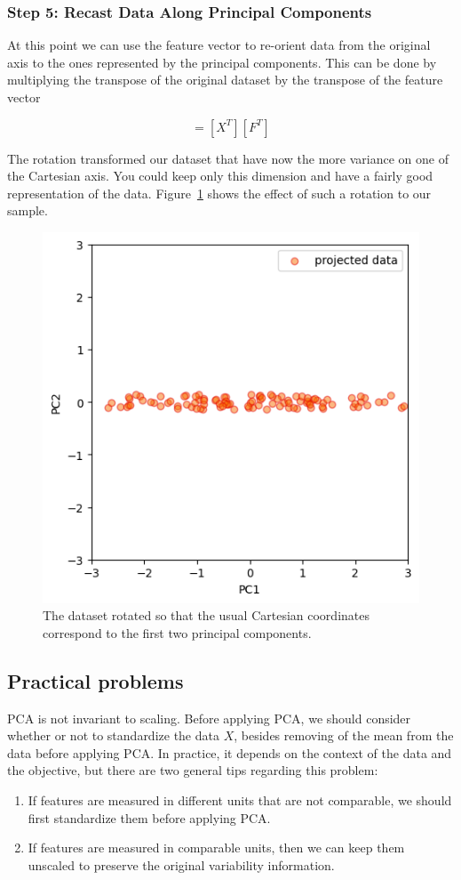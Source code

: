 \subsubsection*{Step 5: Recast Data Along Principal Components}

At this point we can use the feature vector to re-orient data from the original axis to the ones represented by the principal components. 
This can be done by multiplying the transpose of the original dataset by the transpose of the feature vector

\begin{equation}
[Y] = [X^T][F^T]
\end{equation}

The rotation transformed our dataset that have now the more variance on one of the Cartesian axis. 
You could keep only this dimension and have a fairly good representation of the data. Figure~\ref{fig:pca_rotated} shows the effect of such a rotation to our sample.
\begin{figure}[hbtp]
\centering
\includegraphics[width=0.5\linewidth]{figures/pca_projected}
\caption{The dataset rotated so that the usual Cartesian coordinates correspond to the first two principal components.}
\label{fig:pca_rotated}
\end{figure}

\subsection{Practical problems}
PCA is not invariant to scaling. Before applying PCA, we should consider whether or not to standardize the data $X$, besides removing of the mean from the data before applying PCA. In practice, it depends on the context of the data and the objective, but there are two general tips regarding this problem:
\begin{enumerate}
	\item If features are measured in different units that are not comparable, we should first standardize them before applying PCA.
	\item If features are measured in comparable units, then we can keep them unscaled to preserve the original variability information.
\end{enumerate}

